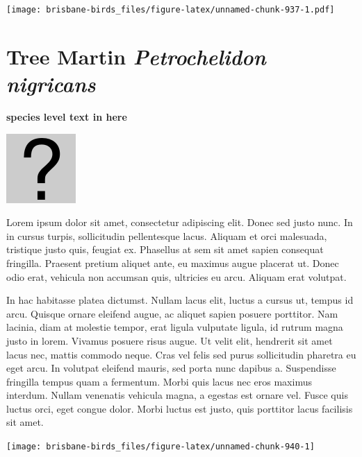 \documentclass[]{book}
\let\origfigure\figure
\let\endorigfigure\endfigure
\renewenvironment{figure}[1][2] {
  \expandafter\origfigure\expandafter[H]
} {
  \endorigfigure
}
\begin{document}
\begin{figure}
\centering
\texttt{[image: brisbane-birds\_files/figure-latex/unnamed-chunk-937-1.pdf]}
\caption{\label{fig:unnamed-chunk-937}insert figure caption}
\end{figure}

\section{\texorpdfstring{Tree Martin \emph{Petrochelidon
nigricans}}{Tree Martin Petrochelidon nigricans}}\label{tree-martin-petrochelidon-nigricans}

\textbf{species level text in here}

\begin{figure}
\centering
\includegraphics{assets/missing.png}
\caption{No image for species}
\end{figure}

Lorem ipsum dolor sit amet, consectetur adipiscing elit. Donec sed justo
nunc. In in cursus turpis, sollicitudin pellentesque lacus. Aliquam et
orci malesuada, tristique justo quis, feugiat ex. Phasellus at sem sit
amet sapien consequat fringilla. Praesent pretium aliquet ante, eu
maximus augue placerat ut. Donec odio erat, vehicula non accumsan quis,
ultricies eu arcu. Aliquam erat volutpat.

In hac habitasse platea dictumst. Nullam lacus elit, luctus a cursus ut,
tempus id arcu. Quisque ornare eleifend augue, ac aliquet sapien posuere
porttitor. Nam lacinia, diam at molestie tempor, erat ligula vulputate
ligula, id rutrum magna justo in lorem. Vivamus posuere risus augue. Ut
velit elit, hendrerit sit amet lacus nec, mattis commodo neque. Cras vel
felis sed purus sollicitudin pharetra eu eget arcu. In volutpat eleifend
mauris, sed porta nunc dapibus a. Suspendisse fringilla tempus quam a
fermentum. Morbi quis lacus nec eros maximus interdum. Nullam venenatis
vehicula magna, a egestas est ornare vel. Fusce quis luctus orci, eget
congue dolor. Morbi luctus est justo, quis porttitor lacus facilisis sit
amet.

\begin{figure}
\texttt{[image: brisbane-birds\_files/figure-latex/unnamed-chunk-940-1]} \caption{insert figure caption}\label{fig:unnamed-chunk-940}
\end{figure}
\end{document}
